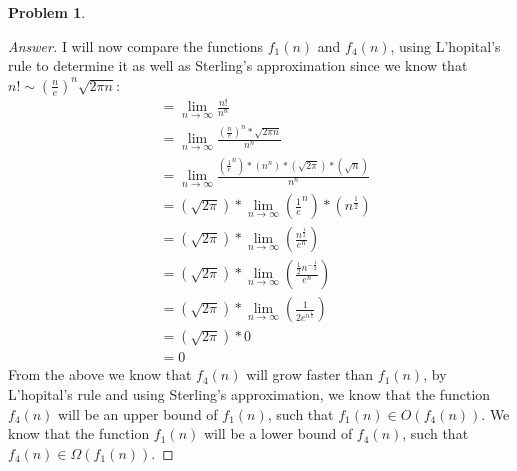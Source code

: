 \documentclass[11pt]{article}
\theoremstyle{definition}
\theoremstyle{definition}
\newtheorem{required}{Problem}
\theoremstyle{definition}
\begin{document}
\begin{required}
\begin{enumerate}[label=(\alph*)]
\begin{proof}[Answer]
I will now compare the functions $f_1(n)$ and $f_4(n)$, using L'hopital's rule to determine it as well as Sterling's approximation since we know that $n! \sim \left(\frac{n}{e}\right)^n \sqrt{2 \pi n}$: \\
\begin{align*}
&= \lim_{n \to \infty} \frac{n!}{n^{n}}\\
&= \lim_{n \to \infty} \frac{(\frac{n}{e})^{n} * \sqrt {2\pi n}}{n^{n}} \\
&= \lim_{n \to \infty} \frac{(\frac{1}{e}^{n})*(n^{n})*(\sqrt{2\pi})*(\sqrt{n})}{n^{n}} \\
&=(\sqrt{2\pi})* \lim_{n \to \infty} (\frac{1}{e}^{n})*(n^{\frac{1}{2}}) \\
&=(\sqrt{2\pi})* \lim_{n \to \infty} (\frac{n^{\frac{1}{2}}}{e^{n}}) \\
&=(\sqrt{2\pi})* \lim_{n \to \infty} (\frac{\frac{1}{2}n^{-\frac{1}{2}}}{e^{n}}) \\
&=(\sqrt{2\pi})* \lim_{n \to \infty} (\frac{1}{2e^{n^\frac{1}{2}}}) \\
&=(\sqrt{2\pi})*0 \\
&=0
\end{align*}
From the above we know that $f_4(n)$ will grow faster than $f_1(n)$, by L'hopital's rule and using Sterling's approximation, we know that the function $f_4(n)$ will be an upper bound of $f_1(n)$, such that $f_1(n) \in O(f_4(n))$. We know that the function $f_1(n)$ will be a lower bound of $f_4(n)$, such that $f_4(n) \in \Omega(f_1(n))$.


\end{proof}
\end{enumerate}
\end{required}
\end{document}
